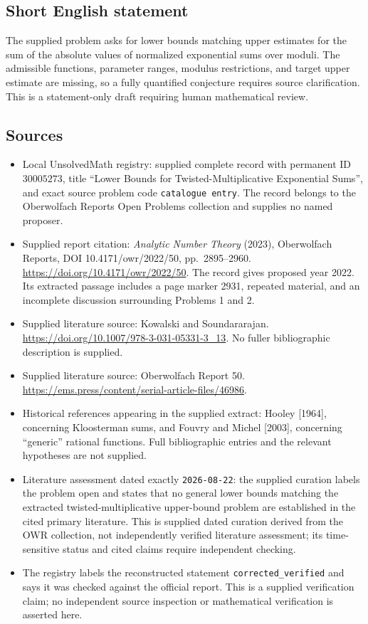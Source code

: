 \documentclass[11pt]{article}
\begin{document}
\subsection{Short English statement}
The supplied problem asks for lower bounds matching upper estimates for the sum of the absolute values of normalized exponential sums over moduli. The admissible functions, parameter ranges, modulus restrictions, and target upper estimate are missing, so a fully quantified conjecture requires source clarification. This is a statement-only draft requiring human mathematical review.
\subsection{Sources}
\begin{itemize}
\item Local UnsolvedMath registry: supplied complete record with permanent ID \(30005273\), title ``Lower Bounds for Twisted-Multiplicative Exponential Sums'', and exact source problem code \texttt{catalogue entry}. The record belongs to the Oberwolfach Reports Open Problems collection and supplies no named proposer.
\item Supplied report citation: \emph{Analytic Number Theory} (2023), Oberwolfach Reports, DOI 10.4171/owr/2022/50, pp.\ 2895--2960. \url{https://doi.org/10.4171/owr/2022/50}. The record gives proposed year 2022. Its extracted passage includes a page marker 2931, repeated material, and an incomplete discussion surrounding Problems 1 and 2.
\item Supplied literature source: Kowalski and Soundararajan. \url{https://doi.org/10.1007/978-3-031-05331-3_13}. No fuller bibliographic description is supplied.
\item Supplied literature source: Oberwolfach Report 50. \url{https://ems.press/content/serial-article-files/46986}.
\item Historical references appearing in the supplied extract: Hooley [1964], concerning Kloosterman sums, and Fouvry and Michel [2003], concerning ``generic'' rational functions. Full bibliographic entries and the relevant hypotheses are not supplied.
\item Literature assessment dated exactly \texttt{2026-08-22}: the supplied curation labels the problem open and states that no general lower bounds matching the extracted twisted-multiplicative upper-bound problem are established in the cited primary literature. This is supplied dated curation derived from the OWR collection, not independently verified literature assessment; its time-sensitive status and cited claims require independent checking.
\item The registry labels the reconstructed statement \texttt{corrected\_verified} and says it was checked against the official report. This is a supplied verification claim; no independent source inspection or mathematical verification is asserted here.
\end{itemize}
\end{document}
